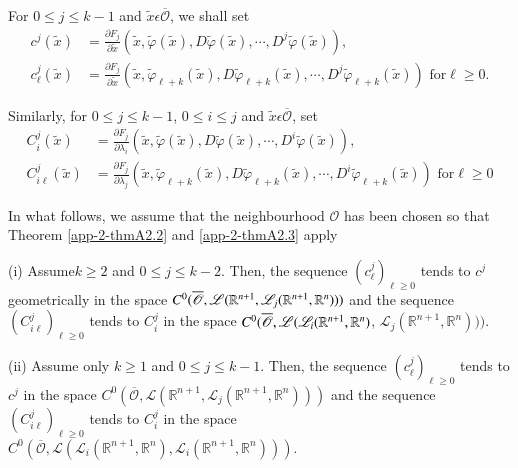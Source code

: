 For $0 \leq j \leq k-1$ and $\widetilde{x} \epsilon
\overline{\mathscr{O}}$, we shall set
\begin{align*}
c^{j}(\widetilde{x}) &   = \frac{\partial F_{j}}{\partial \widetilde{x}}
(\widetilde{x}, \widetilde{\varphi}(\widetilde{x}),
D\widetilde{\varphi}(\widetilde{x}), \cdots,
D^{j}\widetilde{\varphi}(\widetilde{x})),\tag{A2.63}\label{app-2-eqA2.63}\\
c_{\ell}^{j}(\widetilde{x}) & = \frac{\partial F_{j}}{\partial
  \widetilde{x}} (\widetilde{x}, \widetilde{\varphi}_{\ell +
  k}(\widetilde{x}), D\widetilde{\varphi}_{\ell + k} (\widetilde{x}),
\cdots, D^{j}\widetilde{\varphi}_{\ell + k}(\widetilde{x})) \text{ for
} \ell \geq 0.\tag{A2.64}\label{app-2-eqA2.64}
\end{align*}

Similarly, for $0 \leq j \leq k-1$, $0 \leq i \leq j$ and
$\widetilde{x} \epsilon \overline{\mathscr{O}}$, set
\begin{align*}
C_{i}^{j}(\widetilde{x}) & = \frac{\partial F_{j}}{\partial
  \lambda_{i}} (\widetilde{x}, \widetilde{\varphi}(\widetilde{x}),
D\widetilde{\varphi}(\widetilde{x}), \cdots,
D^{i}\widetilde{\varphi}(\widetilde{x})),\tag{A2.65}\label{app-2-eqA2.65}\\
C_{i\ell}^{j}(\widetilde{x}) & = \frac{\partial F_{j}}{\partial
  \lambda_{j}} (\widetilde{x}, \widetilde{\varphi}_{\ell +
  k}(\widetilde{x}), D\widetilde{\varphi}_{\ell + k}(\widetilde{x}),
\cdots, D^{i}\widetilde{\varphi}_{\ell + k}(\widetilde{x})) \text{ for
} \ell \geq 0\tag{A2.66}\label{app-2-eqA2.66}
\end{align*}

In what follows, we assume that the neighbourhood $\mathscr{O}$ has
been chosen so that Theorem \ref{app-2-thmA2.2} and \ref{app-2-thmA2.3} apply

\begin{alphlemma}\label{app-2-lemA2.8}%
(i) Assume\pageoriginale $k \geq 2$ and $0 \leq j \leq k-2$. Then, the
  sequence $(c_{\ell}^{j})_{\ell \geq 0}$ tends to $c^{j}$
  geometrically in the space $C^{0}(\overline{\mathscr{O}},
  \mathscr{L}(\mathbb{R}^{n+1}, \mathscr{L}_{j}(\mathbb{R}^{n+1},\break
  \mathbb{R}^{n})))$ and the sequence $(C_{i\ell}^{j})_{\ell \geq 0}$
  tends to $C_{i}^{j}$ in the space $C^{0} (\overline{\mathscr{O}},\break
  \mathscr{L}(\mathscr{L}_{i}(\mathbb{R}^{n+1}, \mathbb{R}^{n})$,
  $\mathscr{L}_{j}(\mathbb{R}^{n+1}, \mathbb{R}^{n})))$.

(ii) Assume only $k \geq 1$ and $0 \leq j \leq k-1$. Then, the
  sequence $(c_{\ell}^{j})_{\ell \geq 0}$ tends to $c^{j}$ in the
  space $C^{0}(\overline{\mathscr{O}}, \mathscr{L}(\mathbb{R}^{n+1},
  \mathscr{L}_{j}(\mathbb{R}^{n+1}, \mathbb{R}^{n})))$ and the
  sequence $(C_{i\ell}^{j})_{\ell \geq 0}$ tends to $C_{i}^{j}$ in
  the space $C^{0}(\overline{\mathscr{O}},
  \mathscr{L}(\mathscr{L}_{i}(\mathbb{R}^{n+1}, \mathbb{R}^{n}),
  \mathscr{L}_{i}(\mathbb{R}^{n+1}, \mathbb{R}^{n})))$.
  \end{alphlemma}

